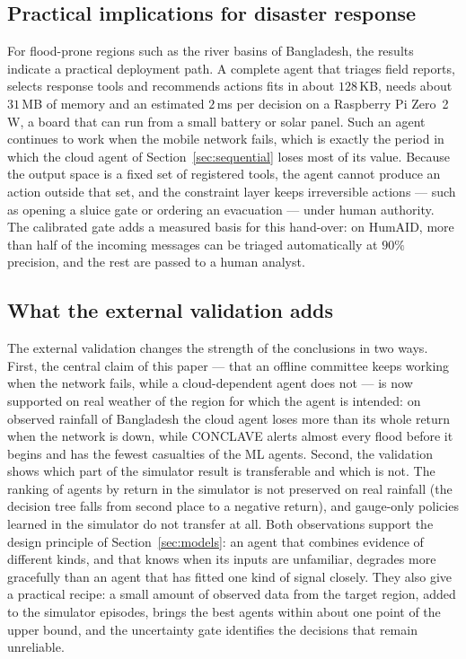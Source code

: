 \documentclass[journal]{IEEEtran}
\begin{document}
\subsection{Practical implications for disaster response}
For flood-prone regions such as the river basins of Bangladesh, the results
indicate a practical deployment path. A complete agent that triages field
reports, selects response tools and recommends actions fits in about
$128$\,KB, needs about $31$\,MB of memory and an estimated $2$\,ms per decision on
a Raspberry Pi Zero~2\,W, a board that can run from a small battery or solar
panel. Such an agent continues to work when the mobile network fails, which
is exactly the period in which the cloud agent of Section~\ref{sec:sequential}
loses most of its value. Because the output space is a fixed set of
registered tools, the agent cannot produce an action outside that set, and the
constraint layer keeps irreversible actions --- such as opening a sluice gate
or ordering an evacuation --- under human authority. The calibrated gate adds a
measured basis for this hand-over: on HumAID, more than half of the incoming
messages can be triaged automatically at $90\%$ precision, and the rest are
passed to a human analyst.

\subsection{What the external validation adds}
The external validation changes the strength of the conclusions in two ways.
First, the central claim of this paper --- that an offline committee keeps
working when the network fails, while a cloud-dependent agent does not --- is
now supported on real weather of the region for which the agent is intended:
on observed rainfall of Bangladesh the cloud agent loses more than its whole
return when the network is down, while CONCLAVE alerts almost every flood
before it begins and has the fewest casualties of the ML agents. Second, the
validation shows which part of the simulator result is transferable and which
is not. The ranking of agents by return in the simulator is not preserved on
real rainfall (the decision tree falls from second place to a negative
return), and gauge-only policies learned in the simulator do not transfer at
all. Both observations support the design principle of
Section~\ref{sec:models}: an agent that combines evidence of different kinds,
and that knows when its inputs are unfamiliar, degrades more gracefully than
an agent that has fitted one kind of signal closely. They also give a practical
recipe: a small amount of observed data from the target region, added to the
simulator episodes, brings the best agents within about one point of the
upper bound, and the
uncertainty gate identifies the decisions that remain unreliable.
\end{document}
